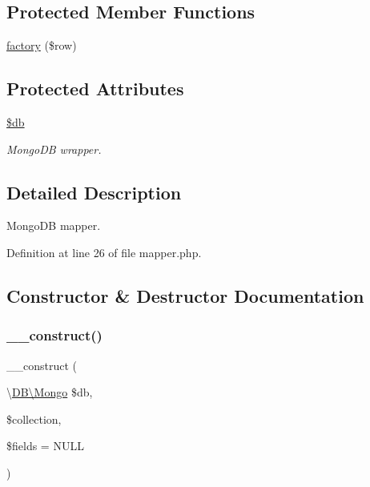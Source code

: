 \subsection*{Protected Member Functions}
\begin{DoxyCompactItemize}
\item 
\hyperlink{class_d_b_1_1_mongo_1_1_mapper_a60e4b1320f31f4049ad7867bd739c14d}{factory} (\$row)
\end{DoxyCompactItemize}
\subsection*{Protected Attributes}
\begin{DoxyCompactItemize}
\item 
\hypertarget{class_d_b_1_1_mongo_1_1_mapper_a1fa3127fc82f96b1436d871ef02be319}{}\label{class_d_b_1_1_mongo_1_1_mapper_a1fa3127fc82f96b1436d871ef02be319} 
\hyperlink{class_d_b_1_1_mongo_1_1_mapper_a1fa3127fc82f96b1436d871ef02be319}{\$db}
\begin{DoxyCompactList}\small\item\em Mongo\+DB wrapper. \end{DoxyCompactList}\end{DoxyCompactItemize}


\subsection{Detailed Description}
Mongo\+DB mapper. 

Definition at line 26 of file mapper.\+php.



\subsection{Constructor \& Destructor Documentation}
\hypertarget{class_d_b_1_1_mongo_1_1_mapper_aebc412b4073d1b6a2439a70a2bbaac47}{}\label{class_d_b_1_1_mongo_1_1_mapper_aebc412b4073d1b6a2439a70a2bbaac47} 
\subsubsection{\texorpdfstring{\+\_\+\+\_\+construct()}{\_\_construct()}}
{\footnotesize\ttfamily \+\_\+\+\_\+construct (\begin{DoxyParamCaption}\item[{\textbackslash{}\hyperlink{class_d_b_1_1_mongo}{D\+B\textbackslash{}\+Mongo}}]{\$db,  }\item[{}]{\$collection,  }\item[{}]{\$fields = {\ttfamily NULL} }\end{DoxyParamCaption})}

